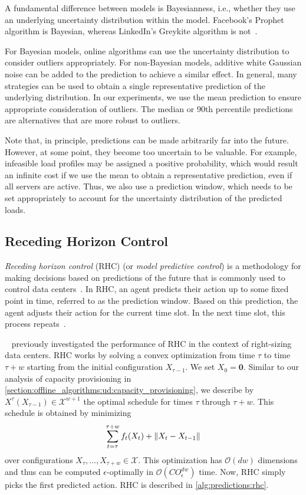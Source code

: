 A fundamental difference between models is Bayesianness, i.e., whether they use an underlying uncertainty distribution within the model. Facebook's Prophet algorithm is Bayesian, whereas LinkedIn's Greykite algorithm is not~\cite{Taylor2017, Hosseini2021}.

For Bayesian models, online algorithms can use the uncertainty distribution to consider outliers appropriately. For non-Bayesian models, additive white Gaussian noise can be added to the prediction to achieve a similar effect. In general, many strategies can be used to obtain a single representative prediction of the underlying distribution. In our experiments, we use the mean prediction to ensure appropriate consideration of outliers. The median or 90th percentile predictions are alternatives that are more robust to outliers.

Note that, in principle, predictions can be made arbitrarily far into the future. However, at some point, they become too uncertain to be valuable. For example, infeasible load profiles may be assigned a positive probability, which would result an infinite cost if we use the mean to obtain a representative prediction, even if all servers are active. Thus, we also use a prediction window, which needs to be set appropriately to account for the uncertainty distribution of the predicted loads.

\subsection{Receding Horizon Control}

\emph{Receding horizon control} (RHC) (or \emph{model predictive control}) is a methodology for making decisions based on predictions of the future that is commonly used to control data centers~\cite{Lin2012}. In RHC, an agent predicts their action up to some fixed point in time, referred to as the prediction window. Based on this prediction, the agent adjusts their action for the current time slot. In the next time slot, this process repeats~\cite{Zak2017}.

\citeauthor{Lin2012}~\cite{Lin2012} previously investigated the performance of RHC in the context of right-sizing data centers. RHC works by solving a convex optimization from time $\tau$ to time $\tau + w$ starting from the initial configuration $X_{\tau-1}$. We set $X_0 = \mathbf{0}$. Similar to our analysis of capacity provisioning in \cref{section:offline_algorithms:ud:capacity_provisioning}, we describe by $X^{\tau}(X_{\tau-1}) \in \mathcal{X}^{w+1}$ the optimal schedule for times $\tau$ through $\tau+w$. This schedule is obtained by minimizing \begin{align}\label{eq:rhc}
    \sum_{t=\tau}^{\tau+w} f_t(X_t) + \lVert X_t - X_{t-1}\rVert
\end{align} over configurations $X_{\tau}, \dots, X_{\tau+w} \in \mathcal{X}$. This optimization has $\mathcal{O}(d w)$ dimensions and thus can be computed $\epsilon$-optimally in $\mathcal{O}(C O_{\epsilon}^{dw})$ time. Now, RHC simply picks the first predicted action. RHC is described in \cref{alg:predictions:rhc}.

